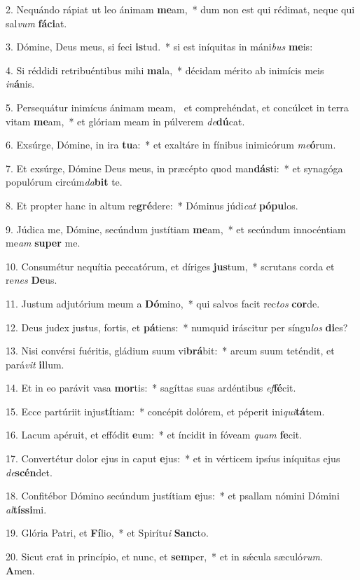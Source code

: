 2. Nequándo rápiat ut leo ánimam \textbf{me}am,~*  dum non est qui rédimat, neque qui sal\textit{vum} \textbf{fá}\textbf{ci}at.\

3. Dómine, Deus meus, si feci \textbf{is}tud.~*  si est iníquitas in máni\textit{bus} \textbf{me}is:\

4. Si réddidi retribuéntibus mihi \textbf{ma}la,~*  décidam mérito ab inimícis meis \textit{in}\textbf{á}nis.\

5. Persequátur inimícus ánimam meam, \dag\  et comprehéndat, et concúlcet in terra vitam \textbf{me}am,~*  et glóriam meam in púlverem \textit{de}\textbf{dú}cat.\

6. Exsúrge, Dómine, in ira \textbf{tu}a:~*  et exaltáre in fínibus inimicórum \textit{me}\textbf{ó}rum.\

7. Et exsúrge, Dómine Deus meus, in præcépto quod man\textbf{dás}ti:~*  et synagóga populórum circúm\textit{da}\textbf{bit} te.\

8. Et propter hanc in altum re\textbf{gré}dere:~*  Dóminus júdi\textit{cat} \textbf{pó}\textbf{pu}los.\

9. Júdica me, Dómine, secúndum justítiam \textbf{me}am,~*  et secúndum innocéntiam me\textit{am} \textbf{su}\textbf{per} me.\

10. Consumétur nequítia peccatórum, et díriges \textbf{jus}tum,~*  scrutans corda et re\textit{nes} \textbf{De}us.\

11. Justum adjutórium meum a \textbf{Dó}mino,~*  qui salvos facit rec\textit{tos} \textbf{cor}de.\

12. Deus judex justus, fortis, et \textbf{pá}tiens:~*  numquid iráscitur per síngu\textit{los} \textbf{di}es?\

13. Nisi convérsi fuéritis, gládium suum vi\textbf{brá}bit:~*  arcum suum teténdit, et pará\textit{vit} \textbf{il}lum.\

14. Et in eo parávit vasa \textbf{mor}tis:~*  sagíttas suas ardéntibus \textit{ef}\textbf{fé}cit.\

15. Ecce partúriit injus\textbf{tí}tiam:~*  concépit dolórem, et péperit ini\textit{qui}\textbf{tá}tem.\

16. Lacum apéruit, et effódit \textbf{e}um:~*  et íncidit in fóveam \textit{quam} \textbf{fe}cit.\

17. Convertétur dolor ejus in caput \textbf{e}jus:~*  et in vérticem ipsíus iníquitas ejus \textit{de}\textbf{scén}det.\

18. Confitébor Dómino secúndum justítiam \textbf{e}jus:~*  et psallam nómini Dómini \textit{al}\textbf{tís}\textbf{si}mi.\

19. Glória Patri, et \textbf{Fí}lio,~*  et Spirítu\textit{i} \textbf{Sanc}to.\

20. Sicut erat in princípio, et nunc, et \textbf{sem}per,~*  et in sǽcula sæculó\textit{rum}. \textbf{A}men.\

